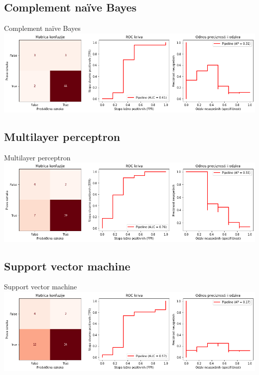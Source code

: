 \documentclass[hyperref={bookmarks=false}]{beamer}
\begin{document}
\subsection{Complement naïve Bayes}
\begin{frame}{Complement naïve Bayes}
\includegraphics[width=\textwidth]{cnb.png}
\end{frame}

\subsection{Multilayer perceptron}
\begin{frame}{Multilayer perceptron}
\includegraphics[width=\textwidth]{mlp.png}
\end{frame}

\subsection{Support vector machine}
\begin{frame}{Support vector machine}
\includegraphics[width=\textwidth]{svm.png}
\end{frame}
\end{document}
